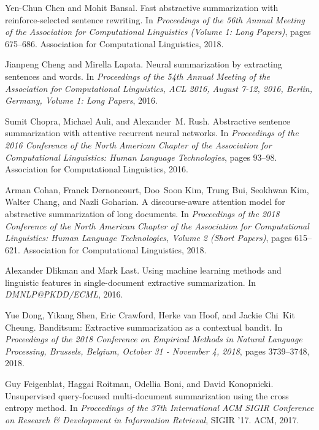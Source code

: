 \documentclass{article}
\begin{document}
\balance

\begin{thebibliography}{10}

Yen-Chun Chen and Mohit Bansal.
\newblock Fast abstractive summarization with reinforce-selected sentence
  rewriting.
\newblock In {\em Proceedings of the 56th Annual Meeting of the Association for
  Computational Linguistics (Volume 1: Long Papers)}, pages 675--686.
  Association for Computational Linguistics, 2018.

Jianpeng Cheng and Mirella Lapata.
\newblock Neural summarization by extracting sentences and words.
\newblock In {\em Proceedings of the 54th Annual Meeting of the Association for
  Computational Linguistics, {ACL} 2016, August 7-12, 2016, Berlin, Germany,
  Volume 1: Long Papers}, 2016.

Sumit Chopra, Michael Auli, and Alexander~M. Rush.
\newblock Abstractive sentence summarization with attentive recurrent neural
  networks.
\newblock In {\em Proceedings of the 2016 Conference of the North American
  Chapter of the Association for Computational Linguistics: Human Language
  Technologies}, pages 93--98. Association for Computational Linguistics, 2016.

Arman Cohan, Franck Dernoncourt, Doo~Soon Kim, Trung Bui, Seokhwan Kim, Walter
  Chang, and Nazli Goharian.
\newblock A discourse-aware attention model for abstractive summarization of
  long documents.
\newblock In {\em Proceedings of the 2018 Conference of the North American
  Chapter of the Association for Computational Linguistics: Human Language
  Technologies, Volume 2 (Short Papers)}, pages 615--621. Association for
  Computational Linguistics, 2018.

Alexander Dlikman and Mark Last.
\newblock Using machine learning methods and linguistic features in
  single-document extractive summarization.
\newblock In {\em DMNLP@PKDD/ECML}, 2016.

Yue Dong, Yikang Shen, Eric Crawford, Herke van Hoof, and Jackie Chi~Kit
  Cheung.
\newblock Banditsum: Extractive summarization as a contextual bandit.
\newblock In {\em Proceedings of the 2018 Conference on Empirical Methods in
  Natural Language Processing, Brussels, Belgium, October 31 - November 4,
  2018}, pages 3739--3748, 2018.

Guy Feigenblat, Haggai Roitman, Odellia Boni, and David Konopnicki.
\newblock Unsupervised query-focused multi-document summarization using the
  cross entropy method.
\newblock In {\em Proceedings of the 37th International ACM SIGIR Conference on
  Research \& Development in Information Retrieval}, SIGIR '17. ACM, 2017.


\end{thebibliography}
\end{document}
